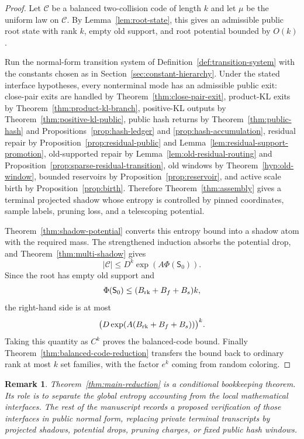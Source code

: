 \documentclass[11pt]{article}
\newtheorem{remark}[theorem]{Remark}
\newcommand{\C}{\mathcal C}
\begin{document}
\begin{proof}
Let $\C$ be a balanced two-collision code of length $k$ and let $\mu$ be the
uniform law on $\C$.  By Lemma~\ref{lem:root-state}, this gives an admissible
public root state with rank $k$, empty old support, and root potential
bounded by $O(k)$.

Run the normal-form transition system of Definition~\ref{def:transition-system}
with the constants chosen as in Section~\ref{sec:constant-hierarchy}.  Under
the stated interface hypotheses, every nonterminal mode has an admissible
public exit: close-pair exits are handled by
Theorem~\ref{thm:close-pair-exit}, product-KL exits by
Theorem~\ref{thm:product-kl-branch}, positive-KL outputs by
Theorem~\ref{thm:positive-kl-public}, public hash returns by
Theorem~\ref{thm:public-hash} and Propositions~\ref{prop:hash-ledger} and
\ref{prop:hash-accumulation}, residual repair by
Proposition~\ref{prop:residual-public} and
Lemma~\ref{lem:residual-support-promotion}, old-supported repair by
Lemma~\ref{lem:old-residual-routing} and
Proposition~\ref{prop:sparse-residual-transition}, old windows by
Theorem~\ref{hyp:old-window}, bounded reservoirs by
Proposition~\ref{prop:reservoir}, and active scale birth by
Proposition~\ref{prop:birth}.  Therefore Theorem~\ref{thm:assembly} gives a
terminal projected shadow whose entropy is controlled by pinned coordinates,
sample labels, pruning loss, and a telescoping potential.

Theorem~\ref{thm:shadow-potential} converts this entropy bound into a shadow
atom with the required mass.  The strengthened induction absorbs the
potential drop, and Theorem~\ref{thm:multi-shadow} gives
\[
  |\C|\le D^k\exp(A\Phi(\mathsf S_0)).
\]
Since the root has empty old support and
\[
  \Phi(\mathsf S_0)\le (B_{\rm rk}+B_f+B_s)k,
\]
the right-hand side is at most
\[
  \bigl(D\exp(A(B_{\rm rk}+B_f+B_s))\bigr)^k.
\]
Taking this quantity as $C^k$ proves the balanced-code bound.  Finally
Theorem~\ref{thm:balanced-code-reduction} transfers the bound back to
ordinary rank at most $k$ set families, with the factor $e^k$ coming from
random coloring.
\end{proof}

\begin{remark}
Theorem~\ref{thm:main-reduction} is a conditional bookkeeping theorem.  Its
role is to separate the global entropy accounting from the local mathematical
interfaces.  The rest of the manuscript records a proposed verification of
those interfaces in public normal form, replacing private terminal transcripts
by projected shadows, potential drops, pruning charges, or fixed public hash
windows.
\end{remark}
\end{document}
